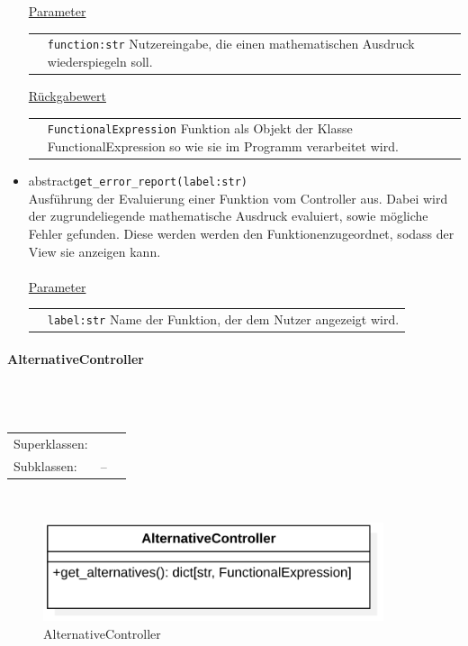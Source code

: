 \documentclass{article}
\newcommand{\classheader}[2][]{\paragraph{#2}
\mbox{}\textit{#1}\\\\}
\newcommand{\classref}[1]{\texttt{\nameref{cls:#1}}}
\begin{document}
\begin{itemize}
\underline{{Parameter}}\\
\begin{tabular}{lp{10.7cm}}
 & \texttt{function:str}  Nutzereingabe, die einen mathematischen Ausdruck wiederspiegeln soll. \\
\end{tabular}
\newline\newline
\underline{{Rückgabewert}}\\
\begin{tabular}{lp{10.7cm}}
 & \texttt{FunctionalExpression} Funktion als Objekt der Klasse FunctionalExpression so wie sie im Programm verarbeitet wird. \\
\end{tabular}


\item \flqq{}abstract\frqq \texttt{get\_error\_report(label:str)}\\ Ausführung der Evaluierung einer Funktion vom Controller aus. Dabei wird der zugrundeliegende mathematische Ausdruck evaluiert, sowie mögliche Fehler gefunden. Diese werden werden den Funktionenzugeordnet, sodass der View sie anzeigen kann. \\\\
\underline{{Parameter}}\\
\begin{tabular}{lp{10.7cm}}
 & \texttt{label:str} Name der Funktion, der dem Nutzer angezeigt wird. \\
\end{tabular}
\end{itemize}


\newpage
\classheader{AlternativeController}\label{cls:AlternativeController}
\begin{tabular}{lll}
 Superklassen: & \classref{FunctionController}\\
 Subklassen: & --
\end{tabular}\\
\begin{figure}[H]%
    \centering
    \includegraphics[width=10cm]{docs/entwurf/Floriane/AlternativeController.png}
    \caption{AlternativeController}
\end{figure}
\end{document}
